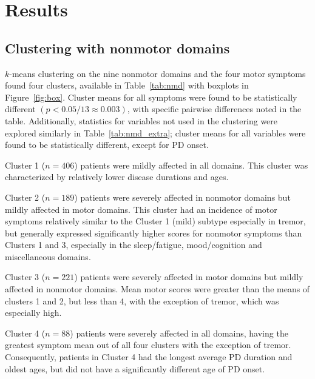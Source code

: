 \documentclass[preprint,3p,twocolumn]{elsarticle} %
\begin{document}
\section{Results}

\subsection{Clustering with nonmotor domains}

$k$-means clustering on the nine nonmotor domains and the four motor symptoms found four clusters,
available in Table~\ref{tab:nmd} with boxplots in Figure~\ref{fig:box}. Cluster means for all
symptoms were found to be statistically different $(p < 0.05 / 13 \approx 0.003)$, with specific
pairwise differences noted in the table. Additionally, statistics for variables not used in the
clustering were explored similarly in Table~\ref{tab:nmd_extra}; cluster means for all variables
were found to be statistically different, except for PD onset.

Cluster 1 ($n = 406$) patients were mildly affected in all domains. This cluster was characterized
by relatively lower disease durations and ages.

Cluster 2 ($n = 189$) patients were severely affected in nonmotor domains but mildly affected in
motor domains. This cluster had an incidence of motor symptoms relatively similar to the Cluster 1
(mild) subtype especially in tremor, but generally expressed significantly higher scores for
nonmotor symptoms than Clusters 1 and 3, especially in the sleep/fatigue, mood/cognition and
miscellaneous domains.

Cluster 3 ($n = 221$) patients were severely affected in motor domains but mildly affected in
nonmotor domains. Mean motor scores were greater than the means of clusters 1 and 2, but less than
4, with the exception of tremor, which was especially high.

Cluster 4 ($n = 88$) patients were severely affected in all domains, having the greatest symptom
mean out of all four clusters with the exception of tremor. Consequently, patients in Cluster 4 had
the longest average PD duration and oldest ages, but did not have a significantly different age of
PD onset.
\end{document}
